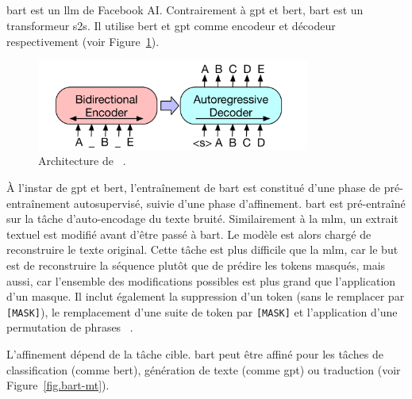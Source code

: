 \subsection{}

\Gls{bart} est un \gls{llm} de Facebook AI.
Contrairement à \gls{gpt} et \gls{bert}, \gls{bart} est un transformeur \gls{s2s}.
Il utilise \gls{bert} et \gls{gpt} comme encodeur et décodeur respectivement
(voir Figure~\ref{fig.bart}).

\begin{figure}[hbt]
    \centering
    \includegraphics[width=0.8\textwidth]{assets/images/bart.png}
    \caption[Architecture de ]
    {Architecture de %
    ~\cite{Lewis_Liu_Goyal_Ghazvininejad_Mohamed_Levy_Stoyanov_Zettlemoyer_2019}.}
    \label{fig.bart}
\end{figure}

À l'instar de \gls{gpt} et \gls{bert}, l'entraînement de \gls{bart} est constitué d'une phase de pré-entraînement
autosupervisé, suivie d'une phase d'affinement.
\gls{bart} est pré-entraîné sur la tâche d'auto-encodage du texte bruité.
Similairement à la \gls{mlm}, un extrait textuel est modifié avant d'être passé à \gls{bart}.
Le modèle est alors chargé de reconstruire le texte original.
Cette tâche est plus difficile que la \gls{mlm}, 
car le but est de reconstruire la séquence plutôt que de prédire les tokens masqués, 
mais aussi, car l'ensemble des modifications possibles est plus grand que l'application d'un masque.
Il inclut également la suppression d'un token (sans le remplacer par \texttt{[MASK]}),
le remplacement d'une suite de token par \texttt{[MASK]} et l'application d'une permutation de phrases%
~\cite{Lewis_Liu_Goyal_Ghazvininejad_Mohamed_Levy_Stoyanov_Zettlemoyer_2019}.

L'affinement dépend de la tâche cible.
\gls{bart} peut être affiné pour les tâches de classification (comme \gls{bert}),
génération de texte (comme \gls{gpt})
ou traduction (voir Figure~\ref{fig.bart-mt}).

